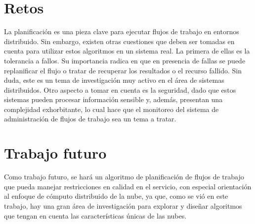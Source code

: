 \section{Retos}
La planificación es una pieza clave para ejecutar flujos de trabajo en entornos distribuido. Sin embargo, existen otras cuestiones que deben ser tomadas en cuenta para utilizar estos algoritmos en un sistema real. La primera de ellas es la tolerancia a fallos. Su importancia radica en que en presencia de fallas se puede replanificar el flujo o tratar de recuperar los resultados o el recurso fallido. Sin duda, este es un tema de investigación muy activo en el área de sistemas distribuidos. Otro aspecto a tomar en cuenta es la seguridad, dado que estos sistemas pueden procesar información sensible y, además, presentan una complejidad exhorbitante, lo cual hace que el monitoreo del sistema de administración de flujos de trabajo sea un tema a tratar.

\section{Trabajo futuro}
Como trabajo futuro, se hará un algoritmo de planificación de flujos de trabajo que pueda manejar restricciones en calidad en el servicio, con especial orientación al enfoque de cómputo distribuido de la nube, ya que, como se vió en este trabajo, hay una gran área de investigación para explorar y diseñar algoritmos que tengan en cuenta las características únicas de las nubes.